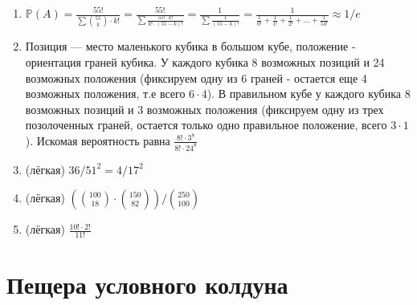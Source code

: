 \documentclass[a4paper,12pt]{article}
\def \P{\mathbb{P}}
\begin{document}
\begin{enumerate}
\item
$\P(A) = \frac{55!}{\sum\binom{55}{k}\cdot k!} = \frac{55!}{\sum\frac{55!\cdot k!}{k!\cdot (55-k)!}}=\frac{1}{\sum \frac{1}{(55-k)!}} = \frac{1}{\frac{1}{0!}+\frac{1}{1!}+\frac{1}{2!}+\dots+\frac{1}{54!}}\approx1/e$


\item
Позиция — место маленького кубика в большом кубе, положение - ориентация граней кубика. У каждого кубика 8 возможных позиций и 24 возможных положения (фиксируем одну из 6 граней - остается еще 4 возможных положения, т.е всего $6\cdot4$). В правильном кубе у каждого кубика 8 возможных позиций и 3 возможных положения (фиксируем одну из трех позолоченных граней, остается только одно правильное положение, всего $3\cdot1$). Искомая вероятность равна $\frac{8!\cdot3^8}{8!\cdot24^8}$
\item (лёгкая)
$36/51^2 = 4/17^2$
\item (лёгкая)
$(\binom{100}{18}\cdot\binom{150}{82})/\binom{250}{100}$
\item (лёгкая)
$\frac{10!\cdot2!}{11!}$
\end{enumerate}
\newpage

\section{Пещера условного колдуна} %
\end{document}
